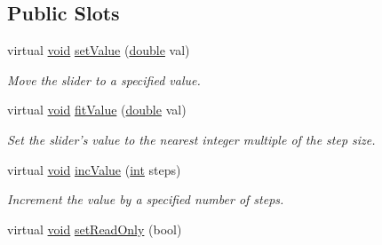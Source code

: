 \subsection*{Public Slots}
\begin{DoxyCompactItemize}
\item 
virtual \hyperlink{group___u_a_v_objects_plugin_ga444cf2ff3f0ecbe028adce838d373f5c}{void} \hyperlink{class_qwt_abstract_slider_ac3713f8989b647cb79f0a5894991e36a}{set\-Value} (\hyperlink{_super_l_u_support_8h_a8956b2b9f49bf918deed98379d159ca7}{double} val)
\begin{DoxyCompactList}\small\item\em Move the slider to a specified value. \end{DoxyCompactList}\item 
virtual \hyperlink{group___u_a_v_objects_plugin_ga444cf2ff3f0ecbe028adce838d373f5c}{void} \hyperlink{class_qwt_abstract_slider_a50ed1e265beaa1c8adbe718caa023e50}{fit\-Value} (\hyperlink{_super_l_u_support_8h_a8956b2b9f49bf918deed98379d159ca7}{double} val)
\begin{DoxyCompactList}\small\item\em Set the slider's value to the nearest integer multiple of the step size. \end{DoxyCompactList}\item 
virtual \hyperlink{group___u_a_v_objects_plugin_ga444cf2ff3f0ecbe028adce838d373f5c}{void} \hyperlink{class_qwt_abstract_slider_a5fccdb2ca370bba9ed4d29864fd80788}{inc\-Value} (\hyperlink{ioapi_8h_a787fa3cf048117ba7123753c1e74fcd6}{int} steps)
\begin{DoxyCompactList}\small\item\em Increment the value by a specified number of steps. \end{DoxyCompactList}\item 
virtual \hyperlink{group___u_a_v_objects_plugin_ga444cf2ff3f0ecbe028adce838d373f5c}{void} \hyperlink{class_qwt_abstract_slider_a9cc63283a2d4f0bcbb67fd331629a318}{set\-Read\-Only} (bool)
\end{DoxyCompactItemize}
